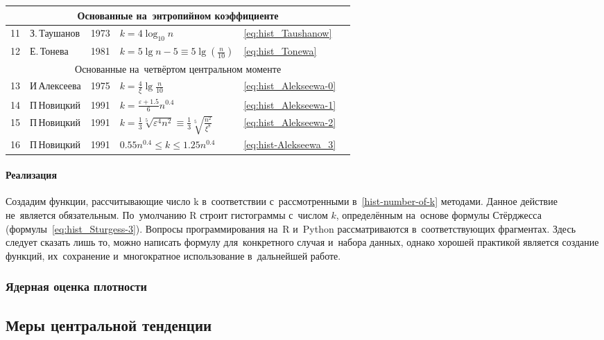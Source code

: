 \documentclass[]{scrartcl}
\begin{document}
\begin{table}[ht]
\begin{tabularx}{\textwidth}{XXXXXX}
		\\ \hline
		\multicolumn{6}{c}{Основанные на~энтропийном коэффициенте}
		\\ \hline
		11 & З.\,Таушанов & 1973 & $k = 4 \log_{10}{n}$ & \ref{eq:hist_Taushanow} & \cite{Taushanow-k-hist}
		\\ \hline
		12 & Е.\,Тонева & 1981 & $k = 5 \lg n - 5 \equiv 5 \lg (\frac{n}{10})$ & \ref{eq:hist_Tonewa} & \cite{Tonewa:k-hist}
		\\ \hline
		\multicolumn{6}{c}{Основанные на~четвёртом центральном моменте}
		\\ \hline
		13 & И\,Алексеева & 1975 & $k = \frac{4}{\xi}\lg\frac{n}{10}$ & \ref{eq:hist_Alekseewa-0} &\cite{Alekseewa:k-hist}
		\\ \hline
		14 & П\,Новицкий & 1991 & $k = \frac{\varepsilon+1.5}{6} n^{0.4}$ & \ref{eq:hist_Alekseewa-1} & \cite{Nowiczkij:oczenka-pogresh}
		\\ \hline
		15 & П\,Новицкий & 1991 & $k = \frac{1}{3}\sqrt[5]{\varepsilon^4 n^2} \equiv \frac{1}{3} \sqrt[5]{\frac{n^2}{\xi^8}}$ & \ref{eq:hist_Alekseewa-2} & \cite{Nowiczkij:oczenka-pogresh}
		\\ \hline
		16 & П\,Новицкий & 1991 & $0.55n^{0.4} \leq k \leq 1.25n^{0.4}$ & \ref{eq:hist-Alekseewa_3} & \cite{Nowiczkij:oczenka-pogresh}
		\\ \hline
		\end{tabularx}
\end{table}

\paragraph{Реализация}
\par
Создадим функции, рассчитывающие число k в~соответствии с~рассмотренными в~\ref{hist-number-of-k} методами. Данное действие не~является обязательным. По~умолчанию R строит гистограммы с~числом $k$, определённым на~основе формулы Стёрджесса (формулы~\ref{eq:hist_Sturgess-3}). Вопросы программирования на~R и~Python рассматриваются в~соответствующих фрагментах. Здесь следует сказать лишь то, можно написать формулу для~конкретного случая и~набора данных, однако хорошей практикой является создание функций, их~сохранение и~многократное использование в~дальнейшей работе.


\subsubsection{Ядерная оценка плотности}
\subsection{Меры центральной тенденции}
\end{document}
